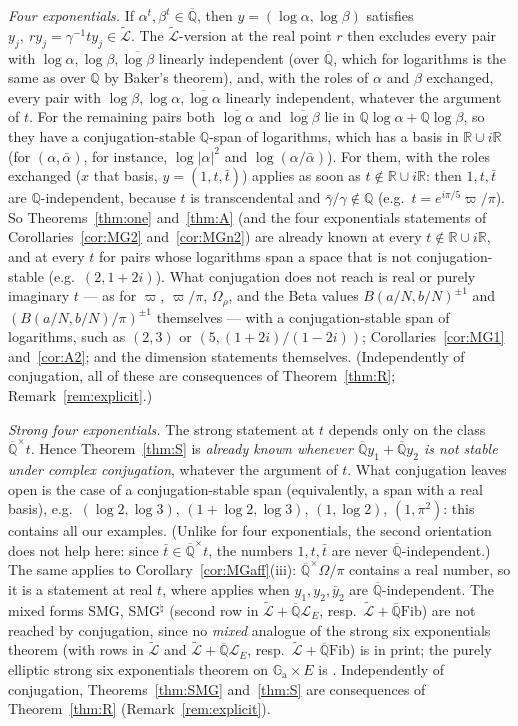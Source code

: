 \documentclass[11pt]{amsart}
\theoremstyle{definition}
\newcommand{\Qb}{\overline{\mathbb{Q}}}
\newcommand{\Q}{\mathbb{Q}}
\newcommand{\R}{\mathbb{R}}
\newcommand{\Ga}{\mathbb{G}_{\mathrm a}}
\newcommand{\Lg}{\mathcal{L}}
\newcommand{\Lt}{\widetilde{\mathcal{L}}}
\newcommand{\vp}{\varpi}
\newcommand{\Fib}{\mathrm{Fib}}
\begin{document}
\emph{Four exponentials.} If $\alpha^t,\beta^t\in\Qb$, then $y=(\log\alpha,\log\beta)$ satisfies
$y_j,\ ry_j=\gamma^{-1}ty_j\in\Lt$. The $\Lt$-version \cite[Thm.~4.1]{W07} at the real point $r$ then excludes every pair
with $\log\alpha,\log\beta,\overline{\log\beta}$ linearly independent (over $\Qb$, which for logarithms is the same as
over $\Q$ by Baker's theorem), and, with the roles of $\alpha$ and $\beta$ exchanged, every pair with
$\log\beta,\log\alpha,\overline{\log\alpha}$ linearly independent, whatever the argument of $t$. For the remaining pairs
both $\overline{\log\alpha}$ and $\overline{\log\beta}$ lie in $\Q\log\alpha+\Q\log\beta$, so they have a
conjugation-stable $\Q$-span of logarithms, which has a basis in $\R\cup i\R$ (for $(\alpha,\bar\alpha)$, for instance,
$\log|\alpha|^2$ and $\log(\alpha/\bar\alpha)$). For them, \cite[Cor.~2.7]{W07} with the roles exchanged ($x$ that basis,
$y=(1,t,\bar t)$) applies as soon as $t\notin\R\cup i\R$: then $1,t,\bar t$ are $\Q$-independent, because $t$ is
transcendental and $\bar\gamma/\gamma\notin\Q$ (e.g.\ $t=e^{i\pi/5}\vp/\pi$). So Theorems~\ref{thm:one} and~\ref{thm:A}
(and the four exponentials statements of Corollaries~\ref{cor:MG2} and~\ref{cor:MGn2}) are already known at every $t\notin\R\cup i\R$, and at every $t$ for
pairs whose logarithms span a space that is not conjugation-stable (e.g.\ $(2,1+2i)$). What conjugation does not reach is real or purely
imaginary $t$ --- as for $\vp$, $\vp/\pi$, $\Omega_\rho$, and the Beta values $B(a/N,b/N)^{\pm1}$ and
$(B(a/N,b/N)/\pi)^{\pm1}$ themselves --- with a conjugation-stable span of logarithms, such as $(2,3)$ or
$(5,(1+2i)/(1-2i))$; Corollaries~\ref{cor:MG1} and~\ref{cor:A2}; and the dimension statements themselves. (Independently of
conjugation, all of these are consequences of Theorem~\ref{thm:R}; Remark~\ref{rem:explicit}.)

\emph{Strong four exponentials.} The strong statement at $t$ depends only on the class $\Qb^\times t$. Hence
Theorem~\ref{thm:S} is \emph{already known whenever $\Qb y_1+\Qb y_2$ is not stable under complex conjugation}, whatever
the argument of $t$. What conjugation leaves open is the case of a conjugation-stable span (equivalently, a span with a
real basis), e.g.\ $(\log2,\log3)$, $(1+\log2,\log3)$, $(1,\log2)$, $(1,\pi^2)$: this contains all our examples. (Unlike for four
exponentials, the second orientation does not help here: since $\bar t\in\Qb^\times t$, the numbers $1,t,\bar t$ are never
$\Qb$-independent.) The same applies to Corollary~\ref{cor:MGaff}(iii): $\Qb^\times\Omega/\pi$ contains a real number, so
it is a statement at real $t$, where \cite[Thm.~4.1]{W07} applies when $y_1,y_2,\bar y_2$ are $\Qb$-independent. The mixed
forms SMG, SMG$^\natural$ (second row in $\Lt+\Qb\Lg_E$, resp.\ $\Lt+\Qb\Fib$) are not reached by conjugation, since no
\emph{mixed} analogue of the strong six exponentials theorem (with rows in $\Lt$ and $\Lt+\Qb\Lg_E$, resp.\ $\Lt+\Qb\Fib$) is
in print; the purely elliptic strong six exponentials theorem on $\Ga\times E$ is \cite[Cor.~1]{RW93}. Independently of
conjugation, Theorems~\ref{thm:SMG} and~\ref{thm:S} are consequences of Theorem~\ref{thm:R} (Remark~\ref{rem:explicit}).
\end{document}
